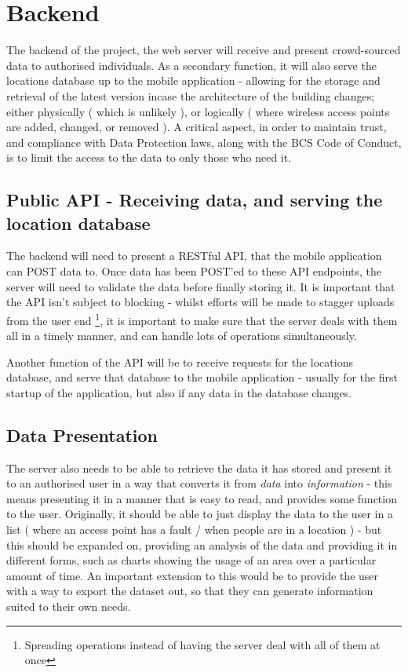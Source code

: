 \documentclass[11pt]{informatics-report}
\begin{document}
\section{Backend}

The backend of the project, the web server will receive and present crowd-sourced data to authorised individuals. As a secondary function, it will also serve the locations database up to the mobile application - allowing for the storage and retrieval of the latest version incase the architecture of the building changes; either physically ( which is unlikely ), or logically ( where wireless access points are added, changed, or removed ). A critical aspect, in order to maintain trust, and compliance with Data Protection laws, along with the BCS Code of Conduct, is to limit the access to the data to only those who need it.


\subsection{Public API - Receiving data, and serving the location database}

The backend will need to present a RESTful API, that the mobile application can POST data to. Once data has been POST'ed to these API endpoints, the server will need to validate the data before finally storing it. It is important that the API isn't subject to blocking - whilst efforts will be made to stagger uploads from the user end \footnote{Spreading operations instead of having the server deal with all of them at once}, it is important to make sure that the server deals with them all in a timely manner, and can handle lots of operations simultaneously.

Another function of the API will be to receive requests for the locations database, and serve that database to the mobile application - usually for the first startup of the application, but also if any data in the database changes.  

\subsection{Data Presentation}

The server also needs to be able to retrieve the data it has stored and present it to an authorised user in a way that converts it from \textit{data} into \textit{information} - this means presenting it in a manner that is easy to read, and provides some function to the user. Originally, it should be able to just display the data to the user in a list ( where an access point has a fault / when people are in a location ) - but this should be expanded on, providing an analysis of the data and providing it in different forms, such as charts showing the usage of an area over a particular amount of time. An important extension to this would be to provide the user with a way to export the dataset out, so that they can generate information suited to their own needs.
\end{document}
